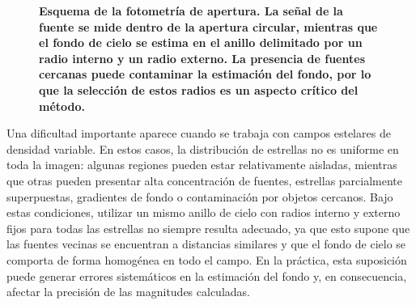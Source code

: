 \documentclass[9pt]{extarticle}
\begin{document}
\begin{figure}[h]
\centering
{}
\caption{\textbf{Esquema de la fotometría de apertura. La señal de la fuente se mide dentro de la apertura circular, mientras que el fondo de cielo se estima en el anillo delimitado por un radio interno y un radio externo. La presencia de fuentes cercanas puede contaminar la estimación del fondo, por lo que la selección de estos radios es un aspecto crítico del método.}}
\label{fig:apertura_anillo}
\end{figure}

Una dificultad importante aparece cuando se trabaja con campos estelares de densidad variable. En estos casos, la distribución de estrellas no es uniforme en toda la imagen: algunas regiones pueden estar relativamente aisladas, mientras que otras pueden presentar alta concentración de fuentes, estrellas parcialmente superpuestas, gradientes de fondo o contaminación por objetos cercanos. Bajo estas condiciones, utilizar un mismo anillo de cielo con radios interno y externo fijos para todas las estrellas no siempre resulta adecuado, ya que esto supone que las fuentes vecinas se encuentran a distancias similares y que el fondo de cielo se comporta de forma homogénea en todo el campo. En la práctica, esta suposición puede generar errores sistemáticos en la estimación del fondo y, en consecuencia, afectar la precisión de las magnitudes calculadas.
\end{document}

